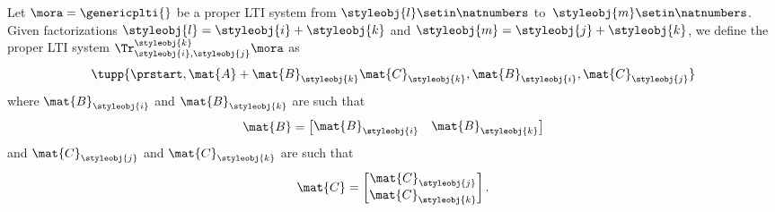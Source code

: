 %

\begin{definition}\label{def:trace-lti}
    Let $\mora = \genericplti{}$ be a proper LTI system from $\styleobj{l}\setin \natnumbers$ to~$\styleobj{m}\setin \natnumbers$.
    Given factorizations $\styleobj{l} = \styleobj{i} + \styleobj{k}$ and $\styleobj{m} = \styleobj{j} + \styleobj{k}$, we define the proper LTI system $\Tr_{\styleobj{i},\styleobj{j}}^{\styleobj{k}}\mora$ as
    \begin{equation}
        \tupp{\prstart,\mat{A} + \mat{B}_\styleobj{k}\mat{C}_\styleobj{k},\mat{B}_\styleobj{i},\mat{C}_\styleobj{j}}
    \end{equation}
    where $\mat{B}_\styleobj{i}$ and $\mat{B}_\styleobj{k}$ are such that
    \begin{equation}
        \mat{B} = \begin{bmatrix}
            \mat{B}_\styleobj{i} & \mat{B}_\styleobj{k}
        \end{bmatrix}
    \end{equation}
    and $\mat{C}_\styleobj{j}$ and $\mat{C}_\styleobj{k}$ are such that
    \begin{equation}
        \mat{C} = \begin{bmatrix}
            \mat{C}_\styleobj{j} \\ \mat{C}_\styleobj{k} \\
        \end{bmatrix}.
    \end{equation}
\end{definition}
